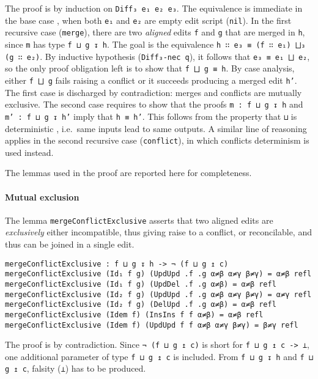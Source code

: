 \documentclass[../Thesis.tex]{subfiles}
\begin{document}
	The proof is by induction on \texttt{Diff₃ e₁ e₂ e₃}.
	The equivalence is immediate in the base case	, when both
	\texttt{e₁} and \texttt{e₂} are empty edit script (\texttt{nil}).
	In the first recursive case (\texttt{merge}), there are 
	two \emph{aligned} edits \texttt{f} and \texttt{g} that are
	merged in \texttt{h}, since \texttt{m} has type \texttt{f ⊔ g ↧ h}.
	The goal is the equivalence \texttt{h ∷ e₃ ≡ (f ∷ e₁) ⨆₃ (g ∷ e₂)}. By inductive 
	hypothesis (\texttt{Diff₃-nec q}), it follows that \texttt{e₃ ≡ e₁ ⨆ e₂}, so
	the only proof obligation left is to show that \texttt{f ⨆ g ≡ h}.
	By case analysis, either \texttt{f ⨆ g} fails raising a conflict or it succeeds
	producing a merged edit \texttt{h'}.
	The first case is discharged by contradiction: merges and conflicts
	are mutually exclusive.
	The second case requires to show that the proofs \texttt{m : f ⊔ g ↧ h}
	and \texttt{m' : f ⊔ g ↧ h'} imply that \texttt{h ≡ h'}.
	This follows from the property that \texttt{⊔} is deterministic 
	\cite{AlgebraOfProgramming}, i.e.\ same inputs lead to same outputs.
	A similar line of reasoning applies in the second recursive
	case (\texttt{conflict}), in which conflicts determinism
	is used instead.
	
	The lemmas used in the proof are reported here for completeness.

	\paragraph{Mutual exclusion}
	\label{par:MutualExclusion}
	The lemma \texttt{mergeConflictExclusive} asserts that two aligned edits
	are \emph{exclusively} either incompatible, 
	thus giving raise to a conflict, or 
	reconcilable, and thus can be joined in a single edit. 

\begin{verbatim}
mergeConflictExclusive : f ⊔ g ↧ h -> ¬ (f ⊔ g ↥ c)
mergeConflictExclusive (Id₁ f g) (UpdUpd .f .g α≠β α≠γ β≠γ) = α≠β refl
mergeConflictExclusive (Id₁ f g) (UpdDel .f .g α≠β) = α≠β refl
mergeConflictExclusive (Id₂ f g) (UpdUpd .f .g α≠β α≠γ β≠γ) = α≠γ refl
mergeConflictExclusive (Id₂ f g) (DelUpd .f .g α≠β) = α≠β refl
mergeConflictExclusive (Idem f) (InsIns f f α≠β) = α≠β refl
mergeConflictExclusive (Idem f) (UpdUpd f f α≠β α≠γ β≠γ) = β≠γ refl
	\end{verbatim}
	
	The proof is by contradiction.
	Since \texttt{¬ (f ⊔ g ↥ c)} is short for \texttt{f ⊔ g ↥ c -> ⊥},
	one additional parameter of type \texttt{f ⊔ g ↥ c} is included.
	From \texttt{f ⊔ g ↧ h} and \texttt{f ⊔ g ↥ c}, falsity (\texttt{⊥})
	has to be produced. 
	
\end{document}
